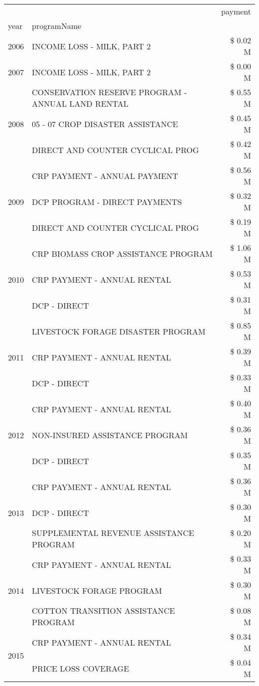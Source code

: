 \begin{tabular}{llr}
\toprule
 &  & payment \\
year & programName &  \\
\midrule
2006 & INCOME LOSS - MILK, PART 2 & \$ 0.02 M \\
\cline{1-3}
2007 & INCOME LOSS - MILK, PART 2 & \$ 0.00 M \\
\cline{1-3}
\multirow[t]{3}{*}{2008} & CONSERVATION RESERVE PROGRAM - ANNUAL LAND RENTAL & \$ 0.55 M \\
 & 05 - 07 CROP DISASTER ASSISTANCE & \$ 0.45 M \\
 & DIRECT AND COUNTER CYCLICAL PROG & \$ 0.42 M \\
\cline{1-3}
\multirow[t]{3}{*}{2009} & CRP PAYMENT - ANNUAL PAYMENT & \$ 0.56 M \\
 & DCP PROGRAM - DIRECT PAYMENTS & \$ 0.32 M \\
 & DIRECT AND COUNTER CYCLICAL PROG & \$ 0.19 M \\
\cline{1-3}
\multirow[t]{3}{*}{2010} & CRP BIOMASS CROP ASSISTANCE PROGRAM & \$ 1.06 M \\
 & CRP PAYMENT - ANNUAL RENTAL & \$ 0.53 M \\
 & DCP - DIRECT & \$ 0.31 M \\
\cline{1-3}
\multirow[t]{3}{*}{2011} & LIVESTOCK FORAGE DISASTER PROGRAM & \$ 0.85 M \\
 & CRP PAYMENT - ANNUAL RENTAL & \$ 0.39 M \\
 & DCP - DIRECT & \$ 0.33 M \\
\cline{1-3}
\multirow[t]{3}{*}{2012} & CRP PAYMENT - ANNUAL RENTAL & \$ 0.40 M \\
 & NON-INSURED ASSISTANCE PROGRAM & \$ 0.36 M \\
 & DCP - DIRECT & \$ 0.35 M \\
\cline{1-3}
\multirow[t]{3}{*}{2013} & CRP PAYMENT - ANNUAL RENTAL & \$ 0.36 M \\
 & DCP - DIRECT & \$ 0.30 M \\
 & SUPPLEMENTAL REVENUE ASSISTANCE PROGRAM & \$ 0.20 M \\
\cline{1-3}
\multirow[t]{3}{*}{2014} & CRP PAYMENT - ANNUAL RENTAL & \$ 0.33 M \\
 & LIVESTOCK FORAGE PROGRAM & \$ 0.30 M \\
 & COTTON TRANSITION ASSISTANCE PROGRAM & \$ 0.08 M \\
\cline{1-3}
\multirow[t]{3}{*}{2015} & CRP PAYMENT - ANNUAL RENTAL & \$ 0.34 M \\
 & PRICE LOSS COVERAGE & \$ 0.04 M \\

\end{tabular}
